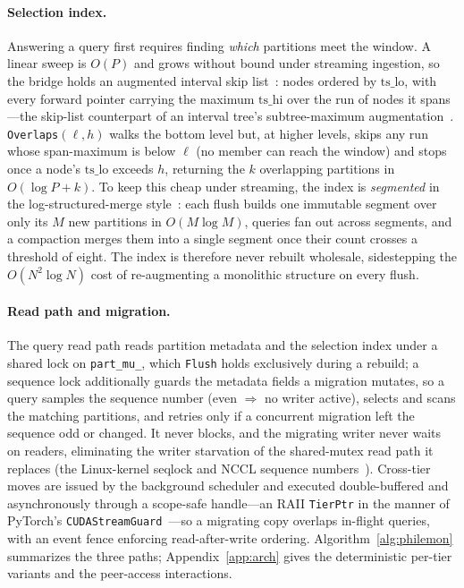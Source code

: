\documentclass[10pt]{article}
\theoremstyle{definition}
\begin{document}
\paragraph{Selection index.}
Answering a query first requires finding \emph{which} partitions meet the window. A
linear sweep is $O(P)$ and grows without bound under streaming ingestion, so the
bridge holds an augmented interval skip list~\citep{pugh1990skiplists}: nodes
ordered by $\mathrm{ts\_lo}$, with every forward pointer carrying the maximum
$\mathrm{ts\_hi}$ over the run of nodes it spans---the skip-list counterpart of an
interval tree's subtree-maximum augmentation~\citep[\S14.3]{clrs2009}.
\texttt{Overlaps}$(\ell,h)$ walks the bottom level but, at higher levels, skips any
run whose span-maximum is below $\ell$ (no member can reach the window) and stops
once a node's $\mathrm{ts\_lo}$ exceeds $h$, returning the $k$ overlapping
partitions in $O(\log P + k)$. To keep this cheap under streaming, the index is
\emph{segmented} in the log-structured-merge style~\citep{oneil1996lsm}: each flush
builds one immutable segment over only its $M$ new partitions in $O(M\log M)$,
queries fan out across segments, and a compaction merges them into a single segment
once their count crosses a threshold of eight. The index is therefore never rebuilt
wholesale, sidestepping the $O(N^2\log N)$ cost of re-augmenting a monolithic
structure on every flush.

\paragraph{Read path and migration.}
The query read path reads partition metadata and the selection index under a shared
lock on \texttt{part\_mu\_}, which \texttt{Flush} holds exclusively during a
rebuild; a sequence lock additionally guards the metadata fields a migration
mutates, so a query samples the sequence number (even $\Rightarrow$ no writer
active), selects and scans the matching partitions, and retries only if a
concurrent migration left the sequence odd or changed. It never blocks, and the
migrating writer never waits on readers, eliminating the writer starvation of the
shared-mutex read path it replaces (the Linux-kernel seqlock and NCCL sequence
numbers~\citep{lamport1979seqcst}). Cross-tier moves are issued by the background
scheduler and executed double-buffered and asynchronously through a scope-safe
handle---an RAII \texttt{TierPtr} in the manner of PyTorch's
\texttt{CUDAStreamGuard}~\citep{paszke2019pytorch}---so a migrating copy overlaps
in-flight queries, with an event fence enforcing read-after-write ordering.
Algorithm~\ref{alg:philemon} summarizes the three paths; Appendix~\ref{app:arch}
gives the deterministic per-tier variants and the peer-access interactions.
\end{document}
